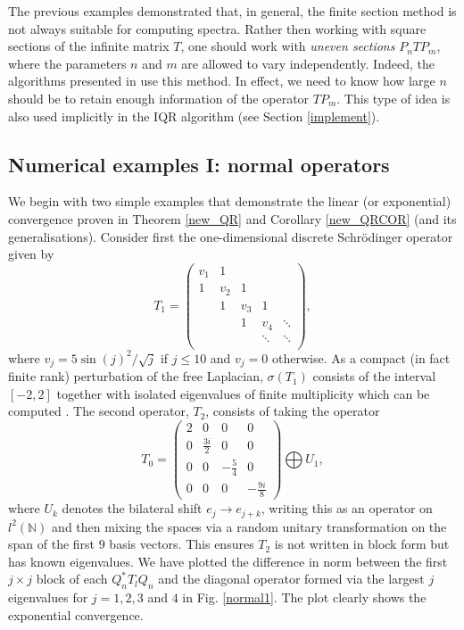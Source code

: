 \documentclass[a4paper,10pt]{article}
\begin{document}
\begin{remark}
The previous examples demonstrated that, in general, the finite section method is not always suitable for computing spectra. Rather then working with square sections of the infinite matrix $T$, one should work with \textit{uneven sections} $P_n T P_m$, where the parameters $n$ and $m$ are allowed to vary independently. Indeed, the algorithms presented in \cite{colb1,hansen2011} use this method. In effect, we need to know how large $n$ should be to retain enough information of the operator $TP_m$. This type of idea is also used implicitly in the IQR algorithm (see Section \ref{implement}).
\end{remark}

\subsection{Numerical examples I: normal operators}
\label{s:num_1}

\begin{example}
We begin with two simple examples that demonstrate the linear (or exponential) convergence proven in Theorem \ref{new_QR} and Corollary \ref{new_QRCOR} (and its generalisations). Consider first the one-dimensional discrete Schr\"odinger operator given by
$$ T_1 = \left(
\begin{matrix}
 v_1      & 1     &        &       &        \\
 1      & v_2     & 1  &  &   \\
       & 1     & v_3       & 1      &   \\
      &      & 1       & v_4      &  \ddots \\
 &   &  & \ddots & \ddots\\
\end{matrix}
\right),
$$
where $v_j=5\sin(j)^2/\sqrt{j}$ if $j\leq 10$ and $v_j=0$ otherwise. As a compact (in fact finite rank) perturbation of the free Laplacian, $\sigma(T_1)$ consists of the interval $[-2,2]$ together with isolated eigenvalues of finite multiplicity which can be computed \cite{webb2017spectra}. The second operator, $T_2$, consists of taking the operator
$$
T_0=\left(
\begin{matrix}
 2      & 0     & 0       & 0 \\
 0      & \frac{3i}{2}     & 0       & 0 \\
 0      & 0     & -\frac{5}{4}       & 0 \\
0      & 0     & 0       & -\frac{9i}{8} 
\end{matrix}
\right)\bigoplus U_{1},
$$
where $U_{k}$ denotes the bilateral shift $e_j\rightarrow e_{j+k}$, writing this as an operator on $l^2(\mathbb{N})$ and then mixing the spaces via a random unitary transformation on the span of the first $9$ basis vectors. This ensures $T_2$ is not written in block form but has known eigenvalues. We have plotted the difference in norm between the first $j\times j$ block of each $Q_n^*T_lQ_n$ and the diagonal operator formed via the largest $j$ eigenvalues for $j=1,2,3$ and $4$ in Fig. \ref{normal1}. The plot clearly shows the exponential convergence.
\end{example}
\end{document}
